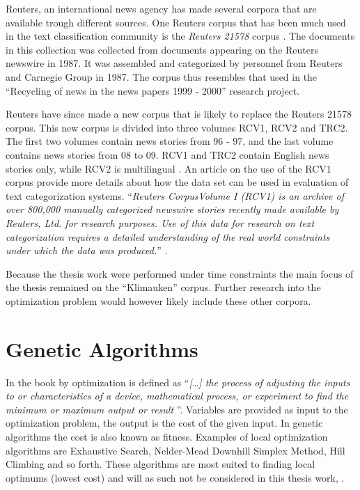 Reuters, an international news agency has made several corpora that are available trough different sources. One Reuters corpus that has been much used in the text classification community is the \textit{Reuters 21578} corpus \cite{Lewis2004a}. The documents in this collection was collected from documents appearing on the Reuters newswire in 1987. It was assembled and categorized by personnel from Reuters and Carnegie Group in 1987. The corpus thus resembles that used in the ``Recycling of news in the news papers 1999 - 2000'' research project.

Reuters have since made a new corpus that is likely to replace the Reuters 21578 corpus. This new corpus is divided into three volumes RCV1, RCV2 and TRC2. The first two volumes contain news stories from 96 - 97, and the last volume contains news stories from 08 to 09. RCV1 and TRC2 contain English news stories only, while RCV2 is multilingual \cite{NationalInstituteofStandardsandTechnology2004}. An article on the use of the RCV1 corpus provide more details about how the data set can be used in evaluation of text categorization systems. ``\textit{Reuters CorpusVolume I (RCV1) is an archive of over 800,000 manually categorized newswire stories recently made available by Reuters, Ltd. for research purposes. Use of this data for research on text categorization requires a detailed understanding of the real world constraints under which the data was produced.}'' \cite{Lewis2004}. 

Because the thesis work were performed under time constraints the main focus of the thesis remained on the ``Klimauken'' corpus. Further research into the optimization problem would however likely include these other corpora.

\section{Genetic Algorithms}
\label{GeneticAlgorithm}
In the book  by \cite{Haupt2004} optimization is defined as ``\textit{[\dots] the process of adjusting the inputs to or characteristics of a device, mathematical process, or experiment to find the minimum or maximum output or result }''. Variables are provided as input to the optimization problem, the output is the cost of the given input. In genetic algorithms the cost is also known as fitness. Examples of local optimization algorithms are Exhaustive Search, Nelder-Mead Downhill Simplex Method, Hill Climbing and so forth. These algorithms are most suited to finding local optimums (lowest cost) and will as such not be considered in this thesis work, \parencite{Haupt2004}.

